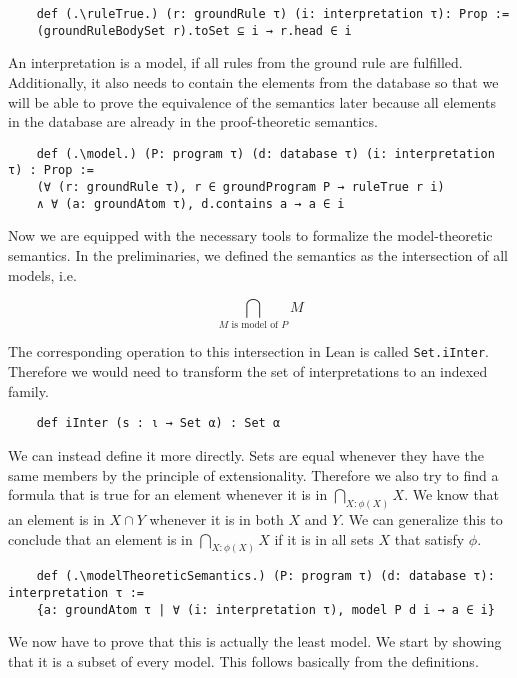 \begin{lstlisting}
    def (.\ruleTrue.) (r: groundRule τ) (i: interpretation τ): Prop := 
    (groundRuleBodySet r).toSet ⊆ i → r.head ∈ i
\end{lstlisting}

An interpretation is a model, if all rules from the ground rule are fulfilled. Additionally, it also needs to contain the elements from the database so that we will be able to prove the equivalence of the semantics later because all elements in the database are already in the proof-theoretic semantics.

\begin{lstlisting}
    def (.\model.) (P: program τ) (d: database τ) (i: interpretation τ) : Prop := 
    (∀ (r: groundRule τ), r ∈ groundProgram P → ruleTrue r i) 
    ∧ ∀ (a: groundAtom τ), d.contains a → a ∈ i
\end{lstlisting}

Now we are equipped with the necessary tools to formalize the model-theoretic semantics. In the preliminaries, we defined the semantics as the intersection of all models, i.e.

\[\bigcap_{\text{$M$ is model of $P$}} M\] 

The corresponding operation to this intersection in Lean is called \lstinline|Set.iInter|. Therefore we would need to transform the set of interpretations to an indexed family.

\begin{lstlisting}
    def iInter (s : ι → Set α) : Set α
\end{lstlisting}

We can instead define it more directly. Sets are equal whenever they have the same members by the principle of extensionality. Therefore we also try to find a formula that is true for an element whenever it is in $\bigcap_{X: \phi(X) } X $. We know that an element is in $X \cap Y$ whenever it is in both $X$ and $Y$. We can generalize this to conclude that an element is in $\bigcap_{X: \phi(X) } X $ if it is in all sets $X$ that satisfy $\phi$.

\begin{lstlisting}
    def (.\modelTheoreticSemantics.) (P: program τ) (d: database τ): interpretation τ := 
    {a: groundAtom τ | ∀ (i: interpretation τ), model P d i → a ∈ i}
\end{lstlisting}

We now have to prove that this is actually the least model. We start by showing that it is a subset of every model. This follows basically from the definitions.

